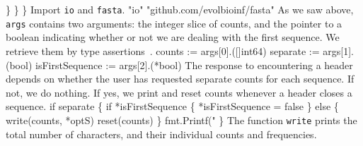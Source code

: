                   \}
          \}
\}
\nwendcode{}\nwdocspar
Import \texttt{io} and \texttt{fasta}.
\nwenddocs{}\plusendmoddef\nwstartdeflinemarkup{}\nwenddeflinemarkup
"io"
"github.com/evolbioinf/fasta"
\nwendcode{}\nwdocspar
As we saw above, \texttt{args} contains two arguments: the integer
slice of counts, and the pointer to a boolean indicating whether or
not we are dealing with the first sequence. We retrieve them by type
assertions~\cite[p. 205]{don16:go}.
\nwenddocs{}\endmoddef\nwstartdeflinemarkup{}\nwenddeflinemarkup
counts := args[0].([]int64)
separate := args[1].(bool)
isFirstSequence := args[2].(*bool)
\nwendcode{}\nwdocspar
The response to encountering a header depends on whether the user has
requested separate counts for each sequence. If not, we do nothing. If
yes, we print and reset counts whenever a header closes a sequence.
\nwenddocs{}\endmoddef\nwstartdeflinemarkup{}\nwenddeflinemarkup
if separate \{
          if *isFirstSequence \{
                  *isFirstSequence = false
          \} else \{
                  write(counts, *optS)
                  reset(counts)
          \}
          fmt.Printf("%
\}
\nwendcode{}\nwdocspar
The function \texttt{write} prints the total number of characters, and
their individual counts and frequencies.
\nwenddocs{}\plusendmoddef\nwstartdeflinemarkup{}\nwenddeflinemarkup
